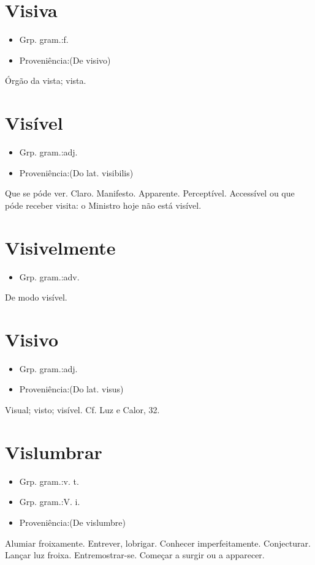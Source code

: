 \documentclass{article}
\begin{document}
\section{Visiva}
\begin{itemize}
\item {Grp. gram.:f.}
\end{itemize}
\begin{itemize}
\item {Proveniência:(De \textunderscore visivo\textunderscore )}
\end{itemize}
Órgão da vista; vista.
\section{Visível}
\begin{itemize}
\item {Grp. gram.:adj.}
\end{itemize}
\begin{itemize}
\item {Proveniência:(Do lat. \textunderscore visibilis\textunderscore )}
\end{itemize}
Que se póde ver.
Claro.
Manifesto.
Apparente.
Perceptível.
Accessível ou que póde receber visita: \textunderscore o Ministro hoje não está visível\textunderscore .
\section{Visivelmente}
\begin{itemize}
\item {Grp. gram.:adv.}
\end{itemize}
De modo visível.
\section{Visivo}
\begin{itemize}
\item {Grp. gram.:adj.}
\end{itemize}
\begin{itemize}
\item {Proveniência:(Do lat. \textunderscore visus\textunderscore )}
\end{itemize}
Visual; visto; visível. Cf. \textunderscore Luz e Calor\textunderscore , 32.
\section{Vislumbrar}
\begin{itemize}
\item {Grp. gram.:v. t.}
\end{itemize}
\begin{itemize}
\item {Grp. gram.:V. i.}
\end{itemize}
\begin{itemize}
\item {Proveniência:(De \textunderscore vislumbre\textunderscore )}
\end{itemize}
Alumiar froixamente.
Entrever, lobrigar.
Conhecer imperfeitamente.
Conjecturar.
Lançar luz froixa.
Entremostrar-se.
Começar a surgir ou a apparecer.
\end{document}
